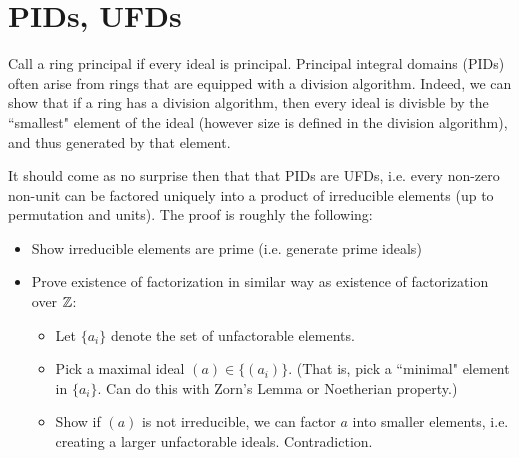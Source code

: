 \section{PIDs, UFDs}
Call a ring principal if every ideal is principal. Principal integral domains (PIDs) often arise from rings that are equipped with a division algorithm. Indeed, we can show that if a ring has a division algorithm, then every ideal is divisble by the ``smallest" element of the ideal (however size is defined in the division algorithm), and thus generated by that element.

It should come as no surprise then that that PIDs are UFDs, i.e. every non-zero non-unit can be factored uniquely into a product of irreducible elements (up to permutation and units). The proof is roughly the following:
\begin{itemize}
    \item Show irreducible elements are prime (i.e. generate prime ideals)
    \item Prove existence of factorization in similar way as existence of factorization over ${\mathbb Z}$:
        \begin{itemize}
            \item Let $\{a_i\}$ denote the set of unfactorable elements.
            \item Pick a maximal ideal $(a) \in \{(a_i)\}$. (That is, pick a ``minimal" element in $\{a_i\}$. Can do this with Zorn's Lemma or Noetherian property.)
            \item Show if $(a)$ is not irreducible, we can factor $a$ into smaller elements, i.e. creating a larger unfactorable ideals. Contradiction.
        \end{itemize}
\end{itemize}
